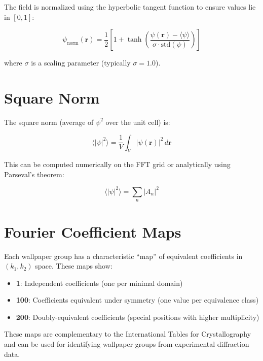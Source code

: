 The field is normalized using the hyperbolic tangent function to ensure values lie in $[0, 1]$:

\begin{equation}
    \psi_{\text{norm}}(\boldsymbol{r}) = \frac{1}{2} \left[ 1 + \tanh\left( \frac{\psi(\boldsymbol{r}) - \langle\psi\rangle}{\sigma \cdot \text{std}(\psi)} \right) \right]
\end{equation}

where $\sigma$ is a scaling parameter (typically $\sigma = 1.0$).

\section{Square Norm}

The square norm (average of $\psi^2$ over the unit cell) is:

\begin{equation}
    \langle|\psi|^2\rangle = \frac{1}{V} \int_V |\psi(\boldsymbol{r})|^2 \, d\boldsymbol{r}
\end{equation}

This can be computed numerically on the FFT grid or analytically using Parseval's theorem:

\begin{equation}
    \langle|\psi|^2\rangle = \sum_n |A_n|^2
\end{equation}

\section{Fourier Coefficient Maps}

Each wallpaper group has a characteristic ``map'' of equivalent coefficients in $(k_1, k_2)$ space. These maps show:
\begin{itemize}
    \item \textbf{1}: Independent coefficients (one per minimal domain)
    \item \textbf{100}: Coefficients equivalent under symmetry (one value per equivalence class)
    \item \textbf{200}: Doubly-equivalent coefficients (special positions with higher multiplicity)
\end{itemize}

These maps are complementary to the International Tables for Crystallography and can be used for identifying wallpaper groups from experimental diffraction data.
